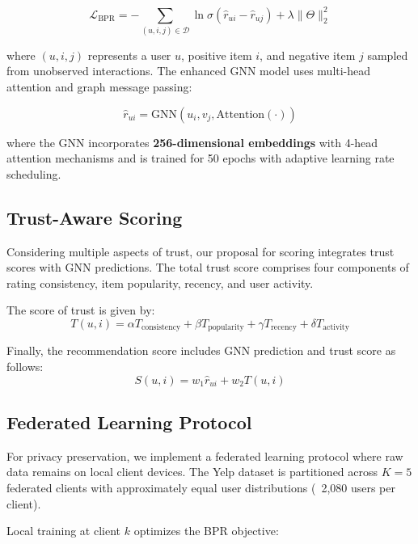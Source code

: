 \documentclass[journal]{IEEEtran} %
\begin{document}
\begin{equation}
\mathcal{L}_{\text{BPR}} = -\sum_{(u,i,j) \in \mathcal{D}} \ln \sigma(\hat{r}_{ui} - \hat{r}_{uj}) + \lambda \|\Theta\|^2_2
\end{equation}

where $(u,i,j)$ represents a user $u$, positive item $i$, and negative item $j$ sampled from unobserved interactions. The enhanced GNN model uses multi-head attention and graph message passing:

\begin{equation}
\hat{r}_{ui} = \text{GNN}(u_i, v_j, \text{Attention}(\cdot))
\end{equation}

where the GNN incorporates \textbf{256-dimensional embeddings} with 4-head attention mechanisms and is trained for 50 epochs with adaptive learning rate scheduling.

\subsection{Trust-Aware Scoring}
Considering multiple aspects of trust, our proposal for scoring integrates trust scores with GNN predictions. The total trust score comprises four components of rating consistency, item popularity, recency, and user activity.

The score of trust is given by:
\begin{equation}
T(u,i) = \alpha T_{\text{consistency}} + \beta T_{\text{popularity}} + \gamma T_{\text{recency}} + \delta T_{\text{activity}}
\end{equation}

Finally, the recommendation score includes GNN prediction and trust score as follows:
\begin{equation}
S(u,i) = w_1 \hat{r}_{ui} + w_2 T(u,i)
\end{equation}

\subsection{Federated Learning Protocol}

For privacy preservation, we implement a federated learning protocol where raw data remains on local client devices. The Yelp dataset is partitioned across $K=5$ federated clients with approximately equal user distributions (~2,080 users per client).

Local training at client $k$ optimizes the BPR objective:
\end{document}
